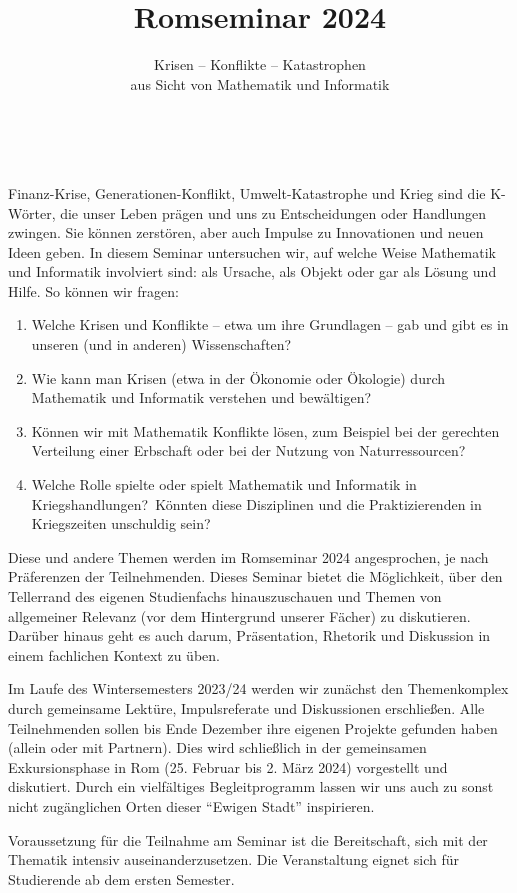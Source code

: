 \documentclass[%
	,ngerman				
	,DIV = 13
	,titlepage=false		
	,twoside=false	 
	]{scrbook}
\title{Romseminar 2024}
\subtitle{Krisen -- Konflikte -- Katastrophen \\
aus Sicht von Mathematik und Informatik}
\date{}
\begin{document}
 
\maketitle
\thispagestyle{empty}
\bigskip        

Finanz-Krise, Generationen-Konflikt, Umwelt-Katastrophe und Krieg sind die K-Wörter, die unser Leben prägen und uns zu Entscheidungen oder Handlungen zwingen. 
Sie können zerstören, aber auch Impulse zu Innovationen und neuen Ideen geben.
In diesem Seminar untersuchen wir, auf welche Weise Mathematik und Informatik involviert sind: als Ursache, als Objekt oder gar als Lösung und Hilfe. So können wir fragen:
%
\begin{enumerate}[$\bullet$]

\item
Welche Krisen und Konflikte -- etwa um ihre Grundlagen -- gab und gibt es in unseren (und in anderen) Wissenschaften? 

\item
Wie kann man Krisen (etwa in der Ökonomie oder Ökologie) durch Mathematik und Informatik verstehen und bewältigen?

\item
Können wir mit Mathematik Konflikte lösen, zum Beispiel bei der gerechten Verteilung einer Erbschaft oder bei der Nutzung von Naturressourcen?

\item
Welche Rolle spielte oder spielt Mathematik und Informatik in Kriegshandlungen? Könnten diese Disziplinen und die Praktizierenden in Kriegszeiten unschuldig sein?

\end{enumerate}
%
Diese und andere Themen werden im Romseminar 2024 angesprochen, je nach Präferenzen der Teilnehmenden. Dieses Seminar bietet die Möglichkeit, über den Tellerrand des eigenen Studienfachs hinauszuschauen und Themen von allgemeiner Relevanz (vor dem Hintergrund unserer Fächer) zu diskutieren. 
Darüber hinaus geht es auch darum, Präsentation, Rhetorik und Diskussion in einem fachlichen Kontext zu üben.

Im Laufe des Wintersemesters 2023/24 werden wir zunächst den Themenkomplex durch gemeinsame Lektüre, Impulsreferate und Diskussionen erschließen. 
Alle Teilnehmenden sollen bis Ende Dezember ihre eigenen Projekte gefunden haben (allein oder mit Partnern). 
Dies wird schließlich in der gemeinsamen Exkursionsphase in Rom (25. Februar bis 2. März 2024) vorgestellt und diskutiert. 
Durch ein vielfältiges Begleitprogramm lassen wir uns auch zu sonst nicht zugänglichen Orten dieser \enquote{Ewigen Stadt} inspirieren.

Voraussetzung für die Teilnahme am Seminar ist die Bereitschaft, sich mit der Thematik intensiv auseinanderzusetzen. 
Die Veranstaltung eignet sich für Studierende ab dem ersten Semester.

 
\end{document}
